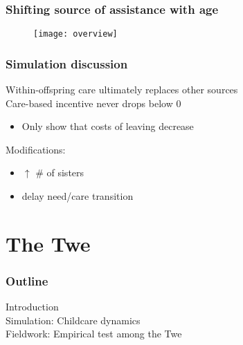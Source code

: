 \documentclass{beamer}
\newenvironment{graytext}{\color{gray}}{\ignorespacesafterend}
\begin{document}

\begin{frame}
\frametitle{Shifting source of assistance with age}
\begin{figure}
\texttt{[image: overview]}
\end{figure}
\end{frame}


\begin{frame}
\frametitle{Simulation discussion}

Within-offspring care ultimately replaces other sources \\
\vspace{0.5cm}
Care-based incentive never drops below 0 \\
\begin{itemize}
\item Only show that costs of leaving decrease
\end{itemize}
\vspace{0.5cm}
Modifications: \\
\begin{itemize}
\item $\uparrow$ \# of sisters
\item delay need/care transition
\end{itemize}

\end{frame}


\section{The Twe}


\begin{frame}

\frametitle{Outline}

\begin{graytext}
Introduction \\
\vspace{0.75cm}
Simulation: Childcare dynamics \\
\end{graytext}
\vspace{0.75cm}
Fieldwork: Empirical test among the Twe

\end{frame}
\end{document}
